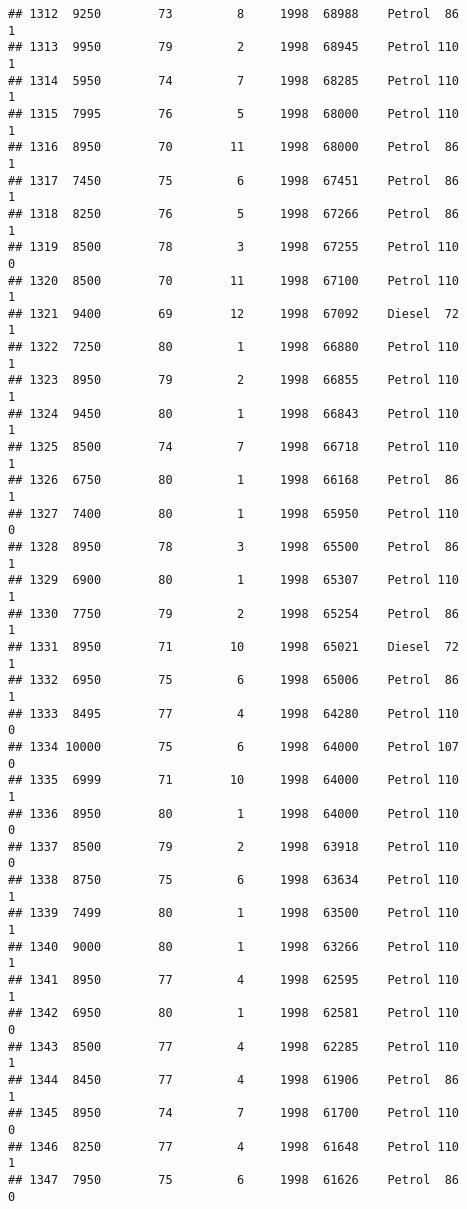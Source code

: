 \documentclass[]{article}
\begin{document}
\begin{verbatim}
## 1312  9250        73         8     1998  68988    Petrol  86         1
## 1313  9950        79         2     1998  68945    Petrol 110         1
## 1314  5950        74         7     1998  68285    Petrol 110         1
## 1315  7995        76         5     1998  68000    Petrol 110         1
## 1316  8950        70        11     1998  68000    Petrol  86         1
## 1317  7450        75         6     1998  67451    Petrol  86         1
## 1318  8250        76         5     1998  67266    Petrol  86         1
## 1319  8500        78         3     1998  67255    Petrol 110         0
## 1320  8500        70        11     1998  67100    Petrol 110         1
## 1321  9400        69        12     1998  67092    Diesel  72         1
## 1322  7250        80         1     1998  66880    Petrol 110         1
## 1323  8950        79         2     1998  66855    Petrol 110         1
## 1324  9450        80         1     1998  66843    Petrol 110         1
## 1325  8500        74         7     1998  66718    Petrol 110         1
## 1326  6750        80         1     1998  66168    Petrol  86         1
## 1327  7400        80         1     1998  65950    Petrol 110         0
## 1328  8950        78         3     1998  65500    Petrol  86         1
## 1329  6900        80         1     1998  65307    Petrol 110         1
## 1330  7750        79         2     1998  65254    Petrol  86         1
## 1331  8950        71        10     1998  65021    Diesel  72         1
## 1332  6950        75         6     1998  65006    Petrol  86         1
## 1333  8495        77         4     1998  64280    Petrol 110         0
## 1334 10000        75         6     1998  64000    Petrol 107         0
## 1335  6999        71        10     1998  64000    Petrol 110         1
## 1336  8950        80         1     1998  64000    Petrol 110         0
## 1337  8500        79         2     1998  63918    Petrol 110         0
## 1338  8750        75         6     1998  63634    Petrol 110         1
## 1339  7499        80         1     1998  63500    Petrol 110         1
## 1340  9000        80         1     1998  63266    Petrol 110         1
## 1341  8950        77         4     1998  62595    Petrol 110         1
## 1342  6950        80         1     1998  62581    Petrol 110         0
## 1343  8500        77         4     1998  62285    Petrol 110         1
## 1344  8450        77         4     1998  61906    Petrol  86         1
## 1345  8950        74         7     1998  61700    Petrol 110         0
## 1346  8250        77         4     1998  61648    Petrol 110         1
## 1347  7950        75         6     1998  61626    Petrol  86         0

\end{verbatim}
\end{document}
